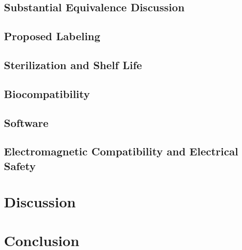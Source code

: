 \documentclass{article}
\begin{document}
\subsection{Substantial Equivalence Discussion}
\subsection{Proposed Labeling}
\subsection{Sterilization and Shelf Life}
\subsection{Biocompatibility}
\subsection{Software}
\subsection{Electromagnetic Compatibility and Electrical Safety}

\section{Discussion}
\label{sec:discussion}

\section{Conclusion}
\label{sec:conclusion}


\newpage
{}


\end{document}
